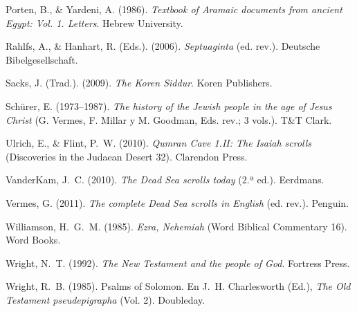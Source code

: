 \documentclass[11pt,letterpaper]{article}
\newcommand{\refapa}[1]{\par{\RaggedRight\hangindent=1.27cm\hangafter=1\noindent #1\par}\vspace{4pt}}
\begin{document}
\refapa{Porten, B., \& Yardeni, A. (1986). \emph{Textbook of Aramaic documents from ancient Egypt: Vol. 1. Letters}. Hebrew University.}
\refapa{Rahlfs, A., \& Hanhart, R. (Eds.). (2006). \emph{Septuaginta} (ed. rev.). Deutsche Bibelgesellschaft.}
\refapa{Sacks, J. (Trad.). (2009). \emph{The Koren Siddur}. Koren Publishers.}
\refapa{Schürer, E. (1973--1987). \emph{The history of the Jewish people in the age of Jesus Christ} (G. Vermes, F. Millar y M. Goodman, Eds. rev.; 3 vols.). T\&T Clark.}
\refapa{Ulrich, E., \& Flint, P.~W. (2010). \emph{Qumran Cave 1.II: The Isaiah scrolls} (Discoveries in the Judaean Desert 32). Clarendon Press.}
\refapa{VanderKam, J.~C. (2010). \emph{The Dead Sea scrolls today} (2.ª ed.). Eerdmans.}
\refapa{Vermes, G. (2011). \emph{The complete Dead Sea scrolls in English} (ed. rev.). Penguin.}
\refapa{Williamson, H.~G.~M. (1985). \emph{Ezra, Nehemiah} (Word Biblical Commentary 16). Word Books.}
\refapa{Wright, N.~T. (1992). \emph{The New Testament and the people of God}. Fortress Press.}
\refapa{Wright, R.~B. (1985). Psalms of Solomon. En J.~H. Charlesworth (Ed.), \emph{The Old Testament pseudepigrapha} (Vol. 2). Doubleday.}
\end{document}
